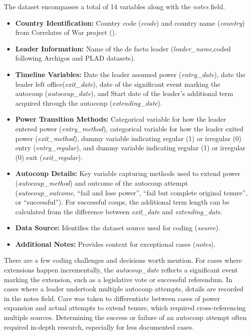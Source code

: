 \documentclass[
  12pt,
]{report}
\begin{document}
The dataset encompasses a total of 14 variables along with the
\emph{notes} field.

\begin{itemize}
\item
  \textbf{Country Identification:} Country code (\emph{ccode}) and
  country name (\emph{country}) from Correlates of War project
  ().
\item
  \textbf{Leader Information:} Name of the de facto leader
  (\emph{leader\_name},coded following Archigos and PLAD datasets).
\item
  \textbf{Timeline Variables:} Date the leader assumed power
  (\emph{entry\_date}), date the leader left office(\emph{exit\_date}),
  date of the significant event marking the autocoup
  (\emph{autocoup\_date}), and Start date of the leader's additional
  term acquired through the autocoup (\emph{extending\_date}).
\item
  \textbf{Power Transition Methods:} Categorical variable for how the
  leader entered power (\emph{entry\_method}), categorical variable for
  how the leader exited power (\emph{exit\_method}), dummy variable
  indicating regular (1) or irregular (0) entry (\emph{entry\_regular}),
  and dummy variable indicating regular (1) or irregular (0) exit
  (\emph{exit\_regular}).
\item
  \textbf{Autocoup Details:} Key variable capturing methods used to
  extend power (\emph{autocoup\_method}) and outcome of the autocoup
  attempt (\emph{autocoup\_outcome}, ``fail and lose power'', ``fail but
  complete original tenure'', or ``successful''). For successful coups,
  the additional term length can be calculated from the difference
  between \emph{exit\_date} and \emph{extending\_date}.
\item
  \textbf{Data Source:} Identifies the dataset source used for coding
  (\emph{source}).
\item
  \textbf{Additional Notes:} Provides context for exceptional cases
  (\emph{notes}).
\end{itemize}

There are a few coding challenges and decisions worth mention. For cases
where extensions happen incrementally, the \emph{autocoup\_date}
reflects a significant event marking the extension, such as a
legislative vote or successful referendum. In cases where a leader
undertook multiple autocoup attempts, details are recorded in the notes
field. Care was taken to differentiate between cases of power expansion
and actual attempts to extend tenure, which required cross-referencing
multiple sources. Determining the success or failure of an autocoup
attempt often required in-depth research, especially for less documented
cases.
\end{document}

